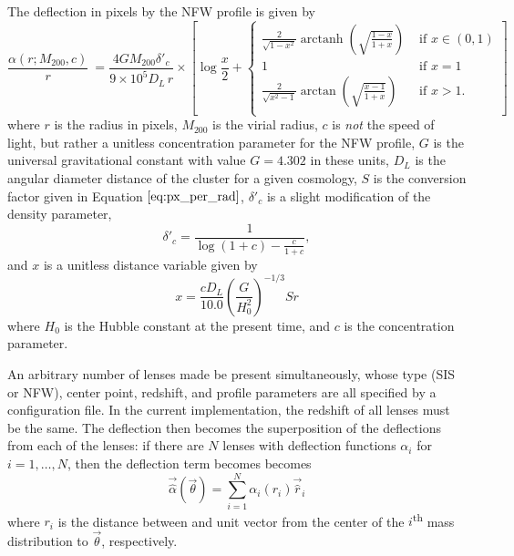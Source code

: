 \documentclass[10pt,twoside]{article}
\theoremstyle{definition}
\theoremstyle{exercise}
\begin{document}
\begin{description}
    The deflection in pixels by the NFW profile is given by
    \begin{equation}
      \frac{\alpha(r; M_{200}, c)}{r} \ =  \frac{4GM_{200}\delta'_c}{9\times 10^5 D_L\, r} \times \left[\log \frac{x}{2} +  
      \begin{cases}
        \frac{2}{\sqrt{1-x^2}}\operatorname{arctanh}\left( \sqrt{\frac{1-x}{1+x}} \right) & \text{ if $x \in (0, 1)$}\\
        1 & \text{ if $x=1$}\\
        \frac{2}{\sqrt{x^2-1}}\arctan\left( \sqrt{\frac{x-1}{1+x}} \right) & \text{ if $x > 1$.}\\
      \end{cases}
      \right]
      \label{eq:NFW_deflection}
    \end{equation}
    where $r$ is the radius in pixels, $M_{200}$ is the virial radius, $c$ is \textit{not} the speed of light, but rather a unitless concentration parameter for the NFW profile, $G$ is the universal gravitational constant with value $G = 4.302$ in these units, $D_L$ is the angular diameter distance of the cluster for a given cosmology, $S$ is the conversion factor given in Equation $\eqref{eq:px_per_rad}$, $\delta'_c$ is a slight modification of the density parameter, 
    \begin{equation}
      \delta'_c = \frac{1}{\log(1+c)-\frac{c}{1+c}},
        \label{eq:mod_delta_c}
    \end{equation}
    and $x$ is a unitless distance variable given by
    \begin{equation}
      x = \frac{c D_L}{10.0}\left(\frac{G}{H_0^2}\right)^{-1/3}Sr
      \label{eq:unitless_x}
    \end{equation}
    where $H_0$ is the Hubble constant at the present time, and $c$ is the concentration parameter.
\end{description}

An arbitrary number of lenses made be present simultaneously, whose type (SIS or NFW), center point, redshift, and profile parameters are all specified by a configuration file. In the current implementation, the redshift of all lenses must be the same. The deflection then becomes the superposition of the deflections from each of the lenses: if there are $N$ lenses with deflection functions $\alpha_i$ for $i = 1,\dots, N$, then the deflection term becomes becomes
\begin{equation}
  \vec{\hat{\alpha}}(\vec{\theta}) = \sum_{i=1}^N \alpha_i(r_i) \vec{\hat{r}}_i
  \label{eq:superposition_lens_eq}
\end{equation}
where $r_i$ is the distance between and unit vector from the center of the $i$\textsuperscript{th} mass distribution to $\vec{\theta}$, respectively.
\end{document}

